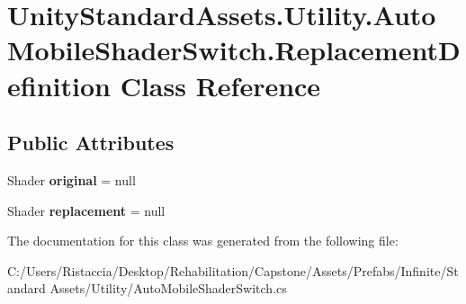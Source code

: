 \hypertarget{class_unity_standard_assets_1_1_utility_1_1_auto_mobile_shader_switch_1_1_replacement_definition}{}\section{Unity\+Standard\+Assets.\+Utility.\+Auto\+Mobile\+Shader\+Switch.\+Replacement\+Definition Class Reference}
\label{class_unity_standard_assets_1_1_utility_1_1_auto_mobile_shader_switch_1_1_replacement_definition}
\subsection*{Public Attributes}
\begin{DoxyCompactItemize}
\item 
\mbox{\label{class_unity_standard_assets_1_1_utility_1_1_auto_mobile_shader_switch_1_1_replacement_definition_aedda6be7e719ff5127ba07a7c194359f}} 
Shader {\bfseries original} = null
\item 
\mbox{\label{class_unity_standard_assets_1_1_utility_1_1_auto_mobile_shader_switch_1_1_replacement_definition_aa969ba1a979e7f9b4364fa9d9c4de934}} 
Shader {\bfseries replacement} = null
\end{DoxyCompactItemize}


The documentation for this class was generated from the following file\+:\begin{DoxyCompactItemize}
\item 
C\+:/\+Users/\+Ristaccia/\+Desktop/\+Rehabilitation/\+Capstone/\+Assets/\+Prefabs/\+Infinite/\+Standard Assets/\+Utility/Auto\+Mobile\+Shader\+Switch.\+cs\end{DoxyCompactItemize}

